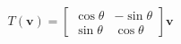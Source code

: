 \documentclass[preview]{standalone}
\begin{document}
\begin{align*}
T(\mathbf{v}) = \begin{bmatrix} \cos\theta & -\sin\theta \\ \sin\theta & \cos\theta \end{bmatrix} \mathbf{v}
\end{align*}
\end{document}
